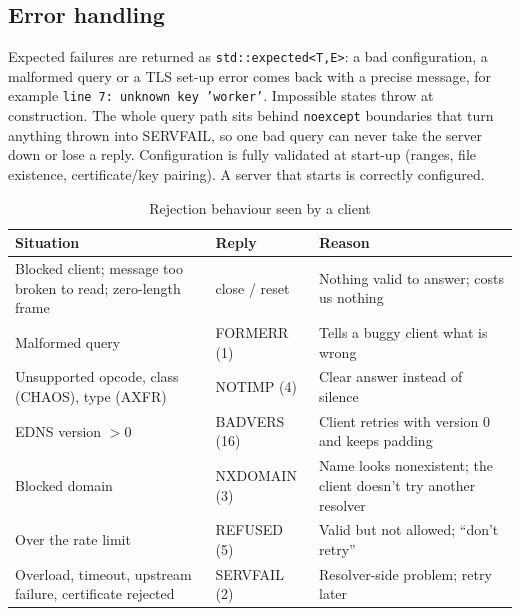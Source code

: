 \documentclass[11pt,a4paper]{article}
\newcommand{\code}[1]{\texttt{#1}}
\begin{document}
\subsection{Error handling}
Expected failures are returned as \code{std::expected<T,E>}: a bad configuration, a malformed query or a TLS
set-up error comes back with a precise message, for example \code{line 7: unknown key 'worker'}. Impossible
states throw at construction. The whole query path sits behind \code{noexcept} boundaries that turn anything
thrown into SERVFAIL, so one bad query can never take the server down or lose a reply. Configuration is fully
validated at start-up (ranges, file existence, certificate/key pairing). A server that starts is correctly
configured.

\begin{table}[H]
\centering\small
\caption{Rejection behaviour seen by a client}\label{tab:rcodes}
\begin{tabularx}{\textwidth}{@{}P{5.3cm}P{3.0cm}L@{}}
\toprule
Situation & Reply & Reason \\
\midrule
Blocked client; message too broken to read; zero-length frame & close / reset & Nothing valid to answer; costs us nothing \\
Malformed query & FORMERR (1) & Tells a buggy client what is wrong \\
Unsupported opcode, class (CHAOS), type (AXFR) & NOTIMP (4) & Clear answer instead of silence \\
EDNS version $>0$ & BADVERS (16) & Client retries with version 0 and keeps padding \\
Blocked domain & NXDOMAIN (3) & Name looks nonexistent; the client doesn't try another resolver \\
Over the rate limit & REFUSED (5) & Valid but not allowed; ``don't retry'' \\
Overload, timeout, upstream failure, certificate rejected & SERVFAIL (2) & Resolver-side problem; retry later \\
\bottomrule
\end{tabularx}
\end{table}
\end{document}
